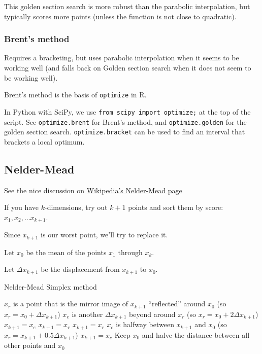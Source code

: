 \documentclass[11pt]{article}
\begin{document}
This golden section search is more robust than the parabolic interpolation, but typically scores more points (unless the function is not close to quadratic).
\subsubsection*{Brent's method}

Requires a bracketing, but uses parabolic interpolation when it seems to be working well (and falls back on Golden section search when it does not seem to be working well).

Brent's method is the basis of {\tt optimize} in R.

In Python with SciPy, we use {\tt from scipy import optimize;} at the top of the script. See {\tt optimize.brent} for Brent's method, and {\tt optimize.golden} for the golden section search. {\tt optimize.bracket} can be used to find an interval that brackets a local optimum.

\subsection{Nelder-Mead}
See the nice discussion on \href{http://en.wikipedia.org/wiki/Nelder%E2%80%93Mead_method}{Wikipedia's Nelder-Mead page}

If you have $k$-dimensions, try out $k+1$ points and sort them by score: $x_1, x_2, \ldots x_{k+1}$.

Since $x_{k+1}$ is our worst point, we'll try to replace it.

Let $x_0$ be the mean of the points $x_1$ through $x_k$.

Let $\Delta x_{k+1}$ be the displacement from $x_{k+1}$ to $x_0$.


\begin{algorithm} 
\caption{Nelder-Mead Simplex method}
\begin{algorithmic}[1]
	\STATE $x_r$ is a point that is the mirror image of $x_{k+1}$ ``reflected'' around $x_0$ (so $x_r = x_0 + \Delta x_{k+1}$)
	\STATE  $x_e$ is another  $\Delta x_{k+1}$ beyond around $x_r$ (so $x_r = x_0 + 2 \Delta x_{k+1}$)
			\STATE $x_{k+1} = x_e$
		\ELSE
			\STATE $x_{k+1} = x_r$
		\ENDIF
		\STATE $x_{k+1} = x_r$
	\ELSE
		\STATE $x_c$ is halfway between $x_{k+1}$ and $x_0$ (so $x_r = x_{k+1} + 0.5\Delta x_{k+1}$)
			\STATE $x_{k+1} = x_c$
		\ELSE 
			\STATE  Keep $x_0$ and halve the distance between all other points and $x_0$
		\ENDIF
	\ENDIF
\end{algorithmic}
\end{algorithm}
\end{document}
